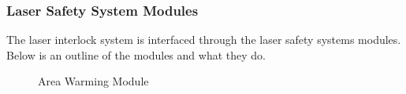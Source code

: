 \documentclass[letterpaper,10pt,english]{sphinxmanual}
\begin{document}
\subsubsection{Laser Safety System Modules}
\label{\detokenize{user_documentation/Vault-1_laser:laser-safety-system-modules}}
\sphinxAtStartPar
The laser interlock system is interfaced through the laser safety systems modules. Below is an outline of the modules and what they do.

\begin{figure}[htbp]
\centering
\capstart

\noindent{}
\caption{ Area Warming Module}\label{\detokenize{user_documentation/Vault-1_laser:id3}}\end{figure}
\end{document}
